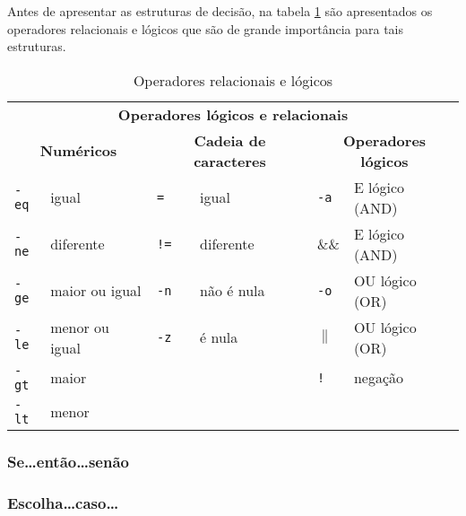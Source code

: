 \documentclass[11pt]{ifscarticle}
\begin{document}
Antes de apresentar as estruturas de decisão, na tabela \ref{tabelaoperadores} são apresentados os operadores relacionais e lógicos que são de grande importância para tais estruturas.

\begin{table}[!htpb]
 \begin{center}
\begin{tabular}{ll||ll||ll} \toprule
\multicolumn{6}{c}{\textbf{Operadores lógicos e relacionais}} \\ 
\multicolumn{2}{c}{\textbf{Numéricos}} & \multicolumn{2}{c}{\textbf{Cadeia de caracteres}} & \multicolumn{2}{c}{\textbf{Operadores lógicos}}\\ \midrule
\texttt{-eq} & igual     & \texttt{=} & igual & \texttt{-a} & E lógico (AND) \\ \hline
\texttt{-ne} & diferente & \texttt{!=} & diferente & \&\& & E lógico (AND)\\ \hline
\texttt{-ge} & maior ou igual & \texttt{-n} & não é nula & \texttt{-o} & OU lógico (OR)\\ \hline
\texttt{-le} & menor ou igual & \texttt{-z} & é nula & $\|$ & OU lógico (OR)\\ \hline
\texttt{-gt} & maior &  & & \texttt{!} & negação \\ \hline
\texttt{-lt} & menor &  &  & &\\ \bottomrule
 \end{tabular}
 \end{center}
\caption{Operadores relacionais e lógicos}
\label{tabelaoperadores}
\end{table}


\subsubsection{Se\ldots então\ldots senão}






\subsubsection{Escolha\ldots caso\ldots}



\end{document}
